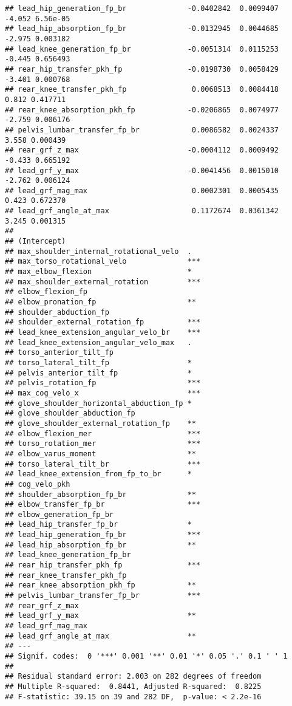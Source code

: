 \documentclass[
]{article}
\begin{document}
\begin{verbatim}
## lead_hip_generation_fp_br              -0.0402842  0.0099407  -4.052 6.56e-05
## lead_hip_absorption_fp_br              -0.0132945  0.0044685  -2.975 0.003182
## lead_knee_generation_fp_br             -0.0051314  0.0115253  -0.445 0.656493
## rear_hip_transfer_pkh_fp               -0.0198730  0.0058429  -3.401 0.000768
## rear_knee_transfer_pkh_fp               0.0068513  0.0084418   0.812 0.417711
## rear_knee_absorption_pkh_fp            -0.0206865  0.0074977  -2.759 0.006176
## pelvis_lumbar_transfer_fp_br            0.0086582  0.0024337   3.558 0.000439
## rear_grf_z_max                         -0.0004112  0.0009492  -0.433 0.665192
## lead_grf_y_max                         -0.0041456  0.0015010  -2.762 0.006124
## lead_grf_mag_max                        0.0002301  0.0005435   0.423 0.672370
## lead_grf_angle_at_max                   0.1172674  0.0361342   3.245 0.001315
##                                           
## (Intercept)                               
## max_shoulder_internal_rotational_velo  .  
## max_torso_rotational_velo              ***
## max_elbow_flexion                      *  
## max_shoulder_external_rotation         ***
## elbow_flexion_fp                          
## elbow_pronation_fp                     ** 
## shoulder_abduction_fp                     
## shoulder_external_rotation_fp          ***
## lead_knee_extension_angular_velo_br    ***
## lead_knee_extension_angular_velo_max   .  
## torso_anterior_tilt_fp                    
## torso_lateral_tilt_fp                  *  
## pelvis_anterior_tilt_fp                *  
## pelvis_rotation_fp                     ***
## max_cog_velo_x                         ***
## glove_shoulder_horizontal_abduction_fp *  
## glove_shoulder_abduction_fp               
## glove_shoulder_external_rotation_fp    ** 
## elbow_flexion_mer                      ***
## torso_rotation_mer                     ***
## elbow_varus_moment                     ** 
## torso_lateral_tilt_br                  ***
## lead_knee_extension_from_fp_to_br      *  
## cog_velo_pkh                              
## shoulder_absorption_fp_br              ** 
## elbow_transfer_fp_br                   ***
## elbow_generation_fp_br                    
## lead_hip_transfer_fp_br                *  
## lead_hip_generation_fp_br              ***
## lead_hip_absorption_fp_br              ** 
## lead_knee_generation_fp_br                
## rear_hip_transfer_pkh_fp               ***
## rear_knee_transfer_pkh_fp                 
## rear_knee_absorption_pkh_fp            ** 
## pelvis_lumbar_transfer_fp_br           ***
## rear_grf_z_max                            
## lead_grf_y_max                         ** 
## lead_grf_mag_max                          
## lead_grf_angle_at_max                  ** 
## ---
## Signif. codes:  0 '***' 0.001 '**' 0.01 '*' 0.05 '.' 0.1 ' ' 1
## 
## Residual standard error: 2.003 on 282 degrees of freedom
## Multiple R-squared:  0.8441, Adjusted R-squared:  0.8225 
## F-statistic: 39.15 on 39 and 282 DF,  p-value: < 2.2e-16
\end{verbatim}
\end{document}
